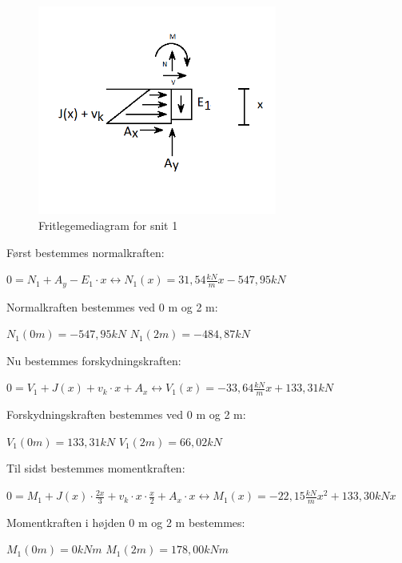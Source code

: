 \begin{figure}[H]
	\centering
	\includegraphics[width=0.7\textwidth]{billeder/snitet.png}
	\caption{Fritlegemediagram for snit 1}
	\label{fig:snitet}
\end{figure}

Først bestemmes normalkraften:
\begin{center}
	$0 = N_1 + A_y - E_1 \cdot x \leftrightarrow N_1(x) = 31,\!54 \frac{kN}{m} x - 547,\!95 kN $
\end{center}

Normalkraften bestemmes ved 0 m og 2 m:
\begin{center}
	$N_1(0m) = -547,\!95 kN$
	\newline
	$N_1(2m) = -484,\!87 kN$
\end{center}

Nu bestemmes forskydningskraften:
\begin{center}
	$0 = V_1 + J(x) + v_k \cdot x + A_x \leftrightarrow V_1(x) = -33,\!64\frac{kN}{m} x + 133,\!31 kN$
\end{center}

Forskydningskraften bestemmes ved 0 m og 2 m:
\begin{center}
	$V_1(0m) = 133,\!31 kN$
	\newline
	$V_1(2m) = 66,\!02 kN$
\end{center}

Til sidst bestemmes momentkraften:
\begin{center}
	$0 = M_1 + J(x) \cdot \frac{2x}{3} + v_k \cdot x \cdot \frac{x}{2} + A_x \cdot x \leftrightarrow M_1(x) = -22,\!15\frac{kN}{m} x^2 + 133,\!30kN x$
\end{center}

Momentkraften i højden 0 m og 2 m bestemmes:
\begin{center}
	$M_1(0m) = 0 kNm$
	\newline
	$M_1(2m) = 178,\!00 kNm$
\end{center}

